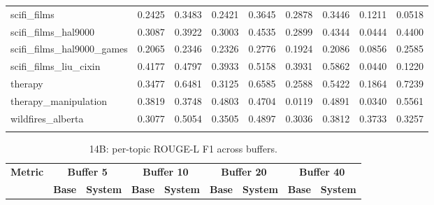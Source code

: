\documentclass[pdflatex,sn-mathphys-num]{sn-jnl}%
\theoremstyle{thmstyleone}%
\theoremstyle{thmstyletwo}%
\theoremstyle{thmstylethree}%
\begin{document}
\begin{appendices}
\begin{landscape}
\begin{longtable}{@{}p{3.8cm}cccccccc@{}}
scifi\_films & 0.2425 & 0.3483 & 0.2421 & 0.3645 & 0.2878 & 0.3446 & 0.1211 & 0.0518 \\
scifi\_films\_hal9000 & 0.3087 & 0.3922 & 0.3003 & 0.4535 & 0.2899 & 0.4344 & 0.0444 & 0.4400 \\
scifi\_films\_hal9000\_games & 0.2065 & 0.2346 & 0.2326 & 0.2776 & 0.1924 & 0.2086 & 0.0856 & 0.2585 \\
scifi\_films\_liu\_cixin & 0.4177 & 0.4797 & 0.3933 & 0.5158 & 0.3931 & 0.5862 & 0.0440 & 0.1220 \\
therapy & 0.3477 & 0.6481 & 0.3125 & 0.6585 & 0.2588 & 0.5422 & 0.1864 & 0.7239 \\
therapy\_manipulation & 0.3819 & 0.3748 & 0.4803 & 0.4704 & 0.0119 & 0.4891 & 0.0340 & 0.5561 \\
wildfires\_alberta & 0.3077 & 0.5054 & 0.3505 & 0.4897 & 0.3036 & 0.3812 & 0.3733 & 0.3257 \\
\botrule
\end{longtable}
\normalsize
\end{landscape}
\begin{landscape}
\tiny
\begin{longtable}{@{}p{3.8cm}cccccccc@{}}
\caption{14B: per-topic ROUGE-L F1 across buffers.}\label{tab:app_14b_rougel_topics}\\

\toprule
\textbf{Metric} & \multicolumn{2}{c}{\textbf{Buffer 5}} & \multicolumn{2}{c}{\textbf{Buffer 10}} & \multicolumn{2}{c}{\textbf{Buffer 20}} & \multicolumn{2}{c}{\textbf{Buffer 40}} \\
\cmidrule(lr){2-3}\cmidrule(lr){4-5}\cmidrule(lr){6-7}\cmidrule(lr){8-9}
 & \textbf{Base} & \textbf{System} & \textbf{Base} & \textbf{System} & \textbf{Base} & \textbf{System} & \textbf{Base} & \textbf{System} \\
\midrule
\endfirsthead


\end{longtable}
\end{landscape}
\end{appendices}
\end{document}
